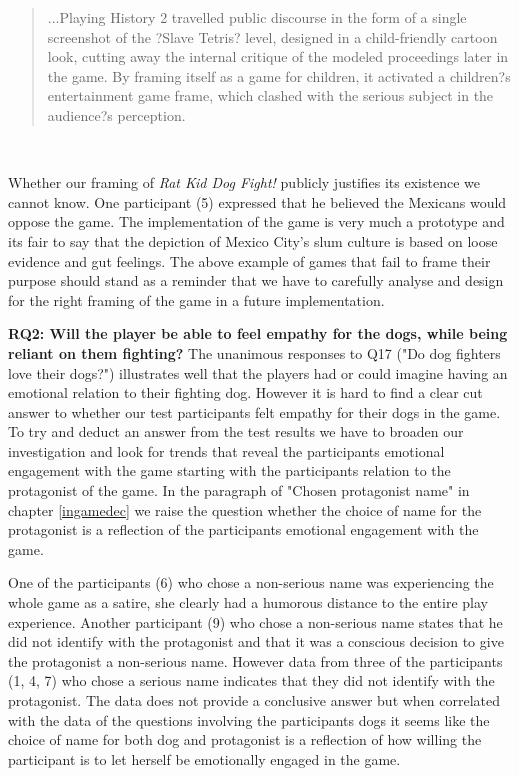 \blockquote{...Playing History 2 travelled public discourse in the form of a single screenshot of the ?Slave Tetris? level, designed in a child-friendly cartoon look, cutting away the internal critique of the modeled proceedings later in the game. By framing itself as a game for children, it activated a children?s entertainment game frame, which clashed with the serious subject in the audience?s perception.}\citep{deterding2016mechanic}\

Whether our framing of \textit{Rat Kid Dog Fight!} publicly justifies its existence we cannot know. One participant (5) expressed that he believed the Mexicans would oppose the game. The implementation of the game is very much a prototype and its fair to say that the depiction of Mexico City's slum culture is based on loose evidence and gut feelings. The above example of games that fail to frame their purpose should stand as a reminder that we have to carefully analyse and design for the right framing of the game in a future implementation.


\textbf{RQ2:  Will the player be able to feel empathy for the dogs, while being reliant on them fighting?}
The unanimous responses to Q17 ("Do dog fighters love their dogs?") illustrates well that the players had or could imagine having an emotional relation to their fighting dog. However it is hard to find a clear cut answer to whether our test participants felt empathy for their dogs in the game. To try and deduct an answer from the test results we have to broaden our investigation and look for trends that reveal the participants emotional engagement with the game starting with the participants relation to the protagonist of the game. In the paragraph of "Chosen protagonist name" in chapter \ref{ingamedec} we raise the question whether the choice of name for the protagonist is a reflection of the participants emotional engagement with the game. \

One of the participants (6) who chose a non-serious name was experiencing the whole game as a satire, she clearly had a humorous distance to the entire play experience. Another participant (9) who chose a non-serious name states that he did not identify with the protagonist and that it was a conscious decision to give the protagonist a non-serious name. However data from three of the participants (1, 4, 7) who chose a serious name indicates that they did not identify with the protagonist. The data does not provide a conclusive answer but when correlated with the data of the questions involving the participants dogs it seems like the choice of name for both dog and protagonist is a reflection of how willing the participant is to let herself be emotionally engaged in the game. 

